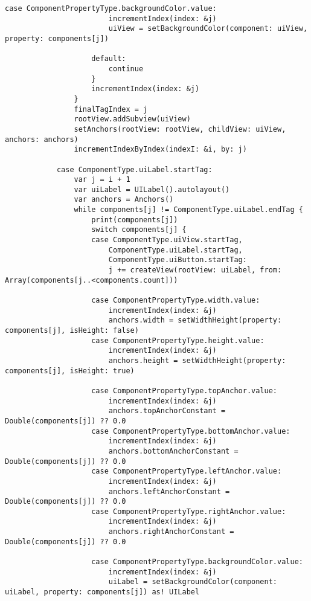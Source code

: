 \begin{lstlisting}[caption={Функция определения списка событий, по свершению которых происходит перезагрузка}]
                    case ComponentPropertyType.backgroundColor.value:
                        incrementIndex(index: &j)
                        uiView = setBackgroundColor(component: uiView, property: components[j])

                    default:
                        continue
                    }
                    incrementIndex(index: &j)
                }
                finalTagIndex = j
                rootView.addSubview(uiView)
                setAnchors(rootView: rootView, childView: uiView, anchors: anchors)
                incrementIndexByIndex(indexI: &i, by: j)

            case ComponentType.uiLabel.startTag:
                var j = i + 1
                var uiLabel = UILabel().autolayout()
                var anchors = Anchors()
                while components[j] != ComponentType.uiLabel.endTag {
                    print(components[j])
                    switch components[j] {
                    case ComponentType.uiView.startTag,
                        ComponentType.uiLabel.startTag,
                        ComponentType.uiButton.startTag:
                        j += createView(rootView: uiLabel, from: Array(components[j..<components.count]))

                    case ComponentPropertyType.width.value:
                        incrementIndex(index: &j)
                        anchors.width = setWidthHeight(property: components[j], isHeight: false)
                    case ComponentPropertyType.height.value:
                        incrementIndex(index: &j)
                        anchors.height = setWidthHeight(property: components[j], isHeight: true)

                    case ComponentPropertyType.topAnchor.value:
                        incrementIndex(index: &j)
                        anchors.topAnchorConstant = Double(components[j]) ?? 0.0
                    case ComponentPropertyType.bottomAnchor.value:
                        incrementIndex(index: &j)
                        anchors.bottomAnchorConstant = Double(components[j]) ?? 0.0
                    case ComponentPropertyType.leftAnchor.value:
                        incrementIndex(index: &j)
                        anchors.leftAnchorConstant = Double(components[j]) ?? 0.0
                    case ComponentPropertyType.rightAnchor.value:
                        incrementIndex(index: &j)
                        anchors.rightAnchorConstant = Double(components[j]) ?? 0.0

                    case ComponentPropertyType.backgroundColor.value:
                        incrementIndex(index: &j)
                        uiLabel = setBackgroundColor(component: uiLabel, property: components[j]) as! UILabel


\end{lstlisting}

